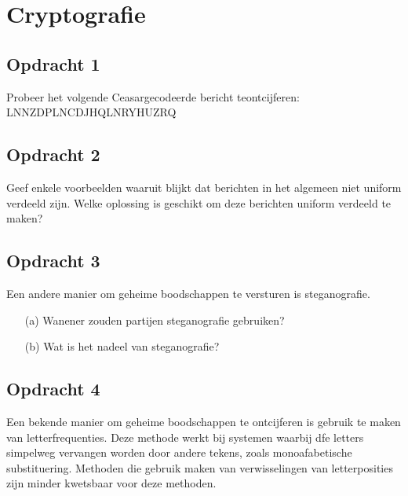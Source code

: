 \chapter{Cryptografie}

\section{Opdracht 1}
Probeer het volgende Ceasargecodeerde bericht teontcijferen:
LNNZDPLNCDJHQLNRYHUZRQ

\section{Opdracht 2}
Geef enkele voorbeelden waaruit blijkt dat berichten in het algemeen niet uniform verdeeld zijn. Welke oplossing is geschikt om deze berichten uniform verdeeld te maken?

\section{Opdracht 3}
Een andere manier om geheime boodschappen te versturen is steganografie.
\begin{itemize}
  \item[(a)] Wanener zouden partijen steganografie gebruiken?
  \item[(b)] Wat is het nadeel van steganografie?
\end{itemize}

\section{Opdracht 4}
Een bekende manier om geheime boodschappen te ontcijferen is gebruik te maken van letterfrequenties. Deze methode werkt bij systemen waarbij dfe letters simpelweg vervangen worden door andere tekens, zoals monoafabetische substituering. Methoden die gebruik maken van verwisselingen van letterposities zijn minder kwetsbaar voor deze methoden.

